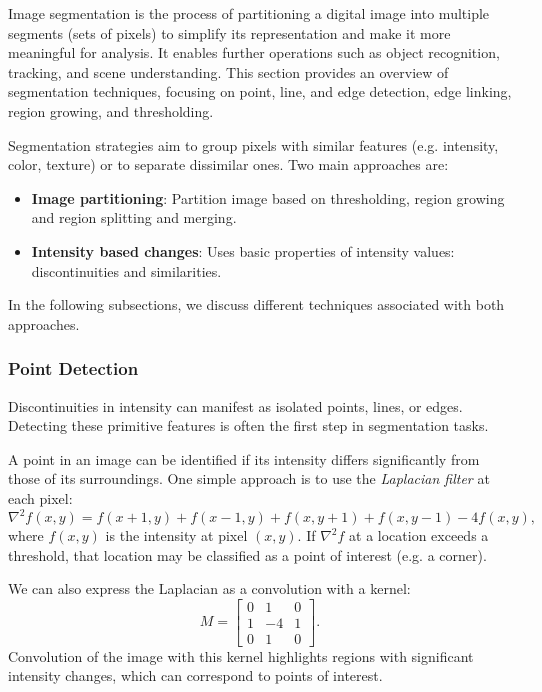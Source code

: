 \documentclass[a4paper,12pt]{article}
\begin{document}
Image segmentation is the process of partitioning a digital image into multiple segments (sets of pixels) to simplify its representation and make it more meaningful for analysis. It enables further operations such as object recognition, tracking, and scene understanding. This section provides an overview of segmentation techniques, focusing on point, line, and edge detection, edge linking, region growing, and thresholding.

Segmentation strategies aim to group pixels with similar features (e.g. intensity, color, texture) or to separate dissimilar ones. Two main approaches are:
\begin{itemize}
    \item \textbf{Image partitioning}: Partition image based on thresholding, region growing and region splitting and merging.
    \item \textbf{Intensity based changes}: Uses basic properties of intensity values: discontinuities and similarities.
\end{itemize}
In the following subsections, we discuss different techniques associated with both approaches.

\subsubsection{Point Detection}

Discontinuities in intensity can manifest as isolated points, lines, or edges. Detecting these primitive features is often the first step in segmentation tasks.

A point in an image can be identified if its intensity differs significantly from those of its surroundings. One simple approach is to use the \emph{Laplacian filter} at each pixel:
\begin{equation}
    \nabla^2 f(x, y) = f(x+1, y) + f(x-1, y) + f(x, y+1) + f(x, y-1) - 4f(x, y),
\end{equation}
where \(f(x, y)\) is the intensity at pixel \((x, y)\). If \(\nabla^2 f\) at a location exceeds a threshold, that location may be classified as a point of interest (e.g. a corner).

We can also express the Laplacian as a convolution with a kernel:
\[
M =
\begin{bmatrix}
0 & 1 & 0 \\
1 & -4 & 1 \\
0 & 1 & 0
\end{bmatrix}.
\]
Convolution of the image with this kernel highlights regions with significant intensity changes, which can correspond to points of interest.
\end{document}
